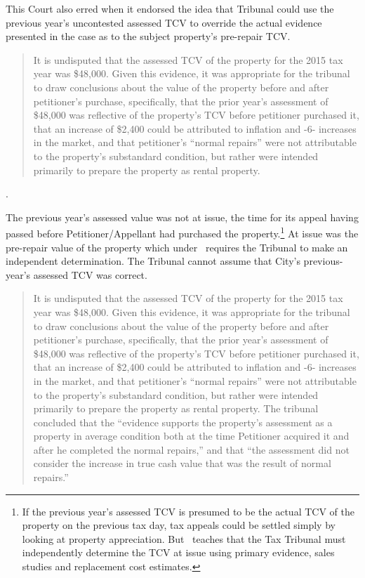 \documentclass[12pt,\documentclassflag]{michiganCourtOfAppealsBrief}
\begin{document}
This Court also erred when it endorsed the idea that Tribunal could use the previous year's uncontested assessed TCV to override the actual evidence presented in the case as to the subject property's pre-repair TCV.

\begin{quote}
  It is undisputed that the assessed
TCV of the property for the 2015 tax year was \$48,000. Given this evidence, it was appropriate
for the tribunal to draw conclusions about the value of the property before and after petitioner's
purchase, specifically, that the prior year's assessment of \$48,000 was reflective of the property's
TCV before petitioner purchased it, that an increase of \$2,400 could be attributed to inflation and 
-6-
increases in the market, and that petitioner's ``normal repairs'' were not attributable to the
property's substandard condition, but rather were intended primarily to prepare the property as
rental property.
\end{quote}

.

The previous year's assessed value was not at issue, the time for its appeal having passed before Petitioner/Appellant had purchased the property.\footnote{If the previous year's assessed TCV is presumed to be the actual TCV of the property on the previous tax day, tax appeals could be settled simply by looking at property appreciation. But \cite{Jones & Laughlin}\ teaches that the Tax Tribunal must independently determine the TCV at issue using primary evidence, sales studies and replacement cost estimates.} At issue was the pre-repair value of the property which under \cite{Jones & Laughlin}\ requires the Tribunal to make an independent  determination. The Tribunal cannot assume that City's previous-year's assessed TCV was correct.


\begin{quotation}
   It is undisputed that the assessed
TCV of the property for the 2015 tax year was \$48,000. Given this evidence, it was appropriate
for the tribunal to draw conclusions about the value of the property before and after petitioner's
purchase, specifically, that the prior year's assessment of \$48,000 was reflective of the property's
TCV before petitioner purchased it, that an increase of \$2,400 could be attributed to inflation and 
-6-
increases in the market, and that petitioner's ``normal repairs'' were not attributable to the
property's substandard condition, but rather were intended primarily to prepare the property as
rental property. The tribunal concluded that the ``evidence supports the property's assessment as
a property in average condition both at the time Petitioner acquired it and after he completed the
normal repairs,'' and that ``the assessment did not consider the increase in true cash value that was
the result of normal repairs.''
\end{quotation}
\end{document}
